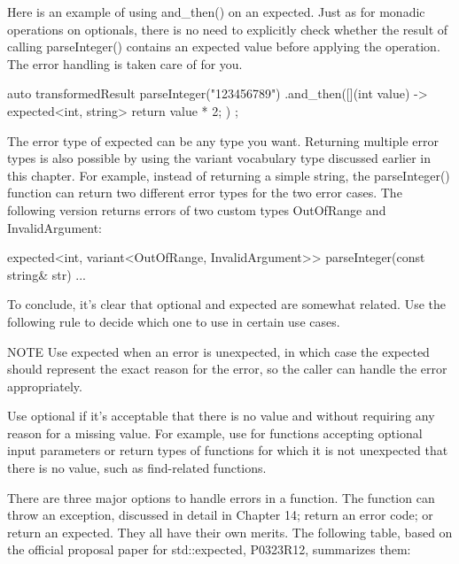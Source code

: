 Here is an example of using and\_then() on an expected. Just as for monadic operations on optionals, there is no need to explicitly check whether the result of calling parseInteger() contains an expected value before applying the operation. The error handling is taken care of for you.

\begin{cpp}
auto transformedResult { parseInteger("123456789")
    .and_then([](int value) -> expected<int, string> { return value * 2; }) };
\end{cpp}

The error type of expected can be any type you want. Returning multiple error types is also possible by using the variant vocabulary type discussed earlier in this chapter. For example, instead of returning a simple string, the parseInteger() function can return two different error types for the two error cases. The following version returns errors of two custom types OutOfRange and InvalidArgument:

\begin{cpp}
expected<int, variant<OutOfRange, InvalidArgument>>
    parseInteger(const string& str) { ... }
\end{cpp}

To conclude, it’s clear that optional and expected are somewhat related. Use the following rule to decide which one to use in certain use cases.

\begin{myNotic}{NOTE}
Use expected when an error is unexpected, in which case the expected should represent the exact reason for the error, so the caller can handle the error appropriately.

Use optional if it’s acceptable that there is no value and without requiring any reason for a missing value. For example, use for functions accepting optional input parameters or return types of functions for which it is not unexpected that there is no value, such as find-related functions.
\end{myNotic}


There are three major options to handle errors in a function. The function can throw an exception, discussed in detail in Chapter 14; return an error code; or return an expected. They all have their own merits. The following table, based on the official proposal paper for std::expected, P0323R12, summarizes them:


